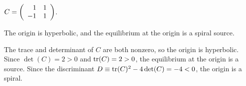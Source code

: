 \documentclass{ximera}
\begin{document}
\begin{exercise}  \label{E:PQb}
$C = \left(\begin{array}{rr} 1 & 1\\ -1 &1\end{array}\right)$.

\begin{solution}
\ans The origin is hyperbolic, and the equilibrium at the origin
is a spiral source.

\soln The trace and determinant of $C$ are both nonzero, so the origin
is hyperbolic.  Since $\det(C) = 2 > 0$ and ${\rm tr}(C) = 2 > 0$,
the equilibrium at the origin is a source.  Since the discriminant
$D \equiv {\rm tr}(C)^2 - 4\det(C) = -4 < 0$, the origin is a spiral.

\end{solution}
\end{exercise}
\end{document}
